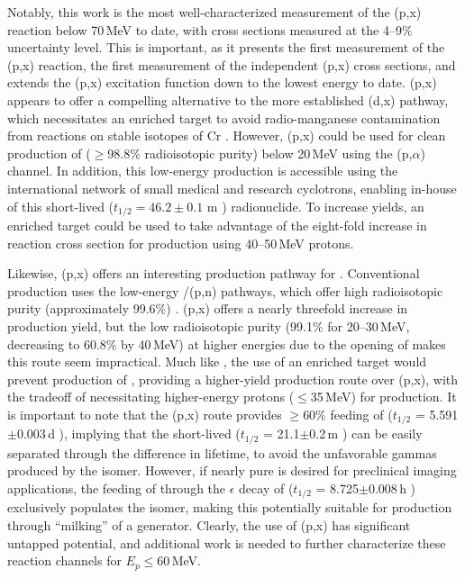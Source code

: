

Notably, this work is the most well-characterized measurement of the (p,x) reaction below 70\,MeV to date, with cross sections measured  at the 4--9\% uncertainty level.
This is important, as it presents the first measurement of the (p,x) reaction,  the first measurement of the independent (p,x) cross sections, and extends the (p,x) excitation function down to the lowest energy to date. 
(p,x) appears to offer a compelling alternative to the more established (d,x) pathway, which necessitates an enriched  target to avoid radio-manganese contamination from reactions on stable isotopes of Cr \cite{Klein2000}.
However, (p,x) could be used for clean production of   ($\geq$98.8\% radioisotopic purity) below 20\,MeV using the (p,$\alpha$) channel.
In addition, this low-energy production is accessible using the international network of small medical and research cyclotrons, enabling in-house of this short-lived ($t_{1/2}=46.2\pm0.1$ m \cite{Wang2017}) radionuclide.
To increase yields, an enriched  target could be used to take advantage of the eight-fold increase in reaction cross section for production using 40--50\,MeV protons.



Likewise, (p,x) offers an interesting production pathway for  .
Conventional production uses the low-energy /(p,n) pathways, which offer high radioisotopic purity (approximately 99.6\%) \cite{Graves2015,Wooten2015}.
(p,x) offers a nearly threefold increase in production yield, but the low radioisotopic purity (99.1\% for 20--30\,MeV, decreasing to 60.8\% by 40\,MeV) at higher energies due to the opening of  makes this route seem impractical.
Much like , the use of an enriched  target would prevent production of , providing a higher-yield production route over   (p,x), with the tradeoff of necessitating higher-energy protons ($\leq$35\,MeV) for production.
It is important to note that the (p,x) route provides $\geq$60\% feeding of  ($t_{1/2}$ = 5.591$\pm$0.003\,d \cite{Dong2015}), implying that the short-lived   ($t_{1/2}$ = 21.1$\pm$0.2\,m \cite{Dong2015}) can be easily separated through the difference in lifetime, to avoid the unfavorable gammas produced by the isomer. 
However, if nearly pure  is desired for preclinical imaging applications, the feeding of  through the $\epsilon$ decay of  ($t_{1/2}$ = 8.725$\pm$0.008\,h \cite{Dong2015}) exclusively populates the isomer, making this potentially suitable for production through \enquote{milking} of a  generator.
Clearly, the use of (p,x) has significant untapped potential, and additional work is needed to further characterize these reaction channels for $E_p \leq$60\,MeV.


